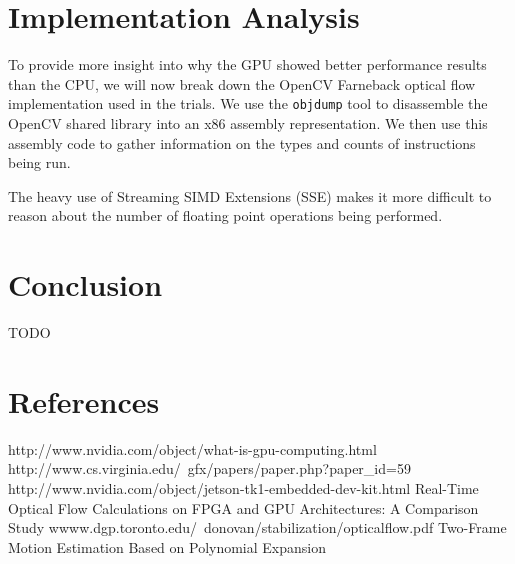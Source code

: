 \documentclass[12pt,letterpaper]{article}
\begin{document}
\section{Implementation Analysis}
To provide more insight into why the GPU showed better performance results than
the CPU, we will now break down the OpenCV Farneback optical flow implementation
used in the trials. We use the \texttt{objdump} tool to disassemble the OpenCV
shared library into an x86 assembly representation. We then use this assembly
code to gather information on the types and counts of instructions being run.

The heavy use of Streaming SIMD Extensions (SSE) makes it more difficult to
reason about the number of floating point operations being performed.

\section{Conclusion}
TODO

\section{References}
\begin{thebibliography}{10}
    http://www.nvidia.com/object/what-is-gpu-computing.html
    http://www.cs.virginia.edu/~gfx/papers/paper.php?paper\_id=59
    http://www.nvidia.com/object/jetson-tk1-embedded-dev-kit.html
    Real-Time Optical Flow Calculations on FPGA and GPU Architectures: A Comparison
    Study
    wwww.dgp.toronto.edu/~donovan/stabilization/opticalflow.pdf
    Two-Frame Motion Estimation Based on Polynomial Expansion
\end{thebibliography}
\end{document}
